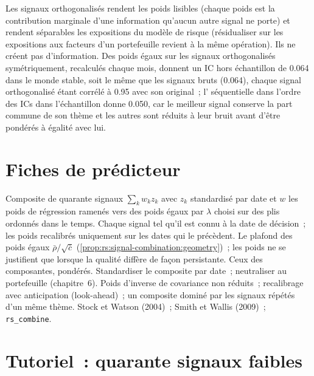 Les signaux orthogonalisés rendent les poids lisibles (chaque poids est la contribution marginale d'une information qu'aucun autre signal ne porte) et rendent
séparables les expositions du modèle de risque (résidualiser sur les expositions aux facteurs d'un portefeuille revient à la même opération). Ils ne créent pas d'information. Des
poids égaux sur les signaux orthogonalisés symétriquement, recalculés chaque mois, donnent un IC hors échantillon de 0.064 dans le monde stable, soit le même que
les signaux bruts (0.064), chaque signal orthogonalisé étant corrélé à 0.95 avec son original~; l' séquentielle dans l'ordre des
ICs dans l'échantillon donne 0.050, car le meilleur signal conserve la part commune de son thème et les autres sont réduits à leur bruit avant
d'être pondérés à égalité avec lui.

\section{Fiches de prédicteur}

\begin{predictorcard}{Composite de quarante signaux}\label{pred:rs:signal-combination:composite}
 $\sum_k w_k z_k$ avec $z_k$ standardisé par date et $w$ les poids de régression ramenés vers des poids égaux par $\lambda$ choisi sur
des plis ordonnés dans le temps.
 Chaque signal tel qu'il est connu à la date de décision~; les poids recalibrés uniquement sur les dates qui le précèdent.
 Le plafond des poids égaux $\bar\rho/\sqrt{\bar c}$ (\cref{prop:rs:signal-combination:geometry})~; les poids ne se justifient que lorsque la
qualité diffère de façon persistante.
 Ceux des composantes, pondérés.
 Standardiser le composite par date~; neutraliser au portefeuille (chapitre~6).
 Poids d'inverse de covariance non réduits~; recalibrage avec anticipation (look-ahead)~; un composite dominé par les signaux répétés d'un même thème.
 Stock et Watson (2004)~; Smith et Wallis (2009)~; \texttt{rs\_combine}.
\end{predictorcard}

\section{Tutoriel~: quarante signaux faibles}\label{tut:rs:signal-combination:tut}

